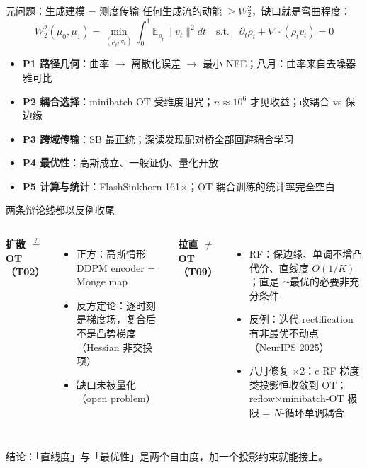 \documentclass[10pt,aspectratio=169]{beamer}
\begin{document}
\begin{frame}{元问题：生成建模 = 测度传输}
任何生成流的动能 $\ge W_2^2$，缺口就是弯曲程度：
\[ W_2^2(\mu_0,\mu_1)=\min_{(\rho_t,v_t)}\int_0^1\mathbb E_{\rho_t}\|v_t\|^2dt\quad\text{s.t.}\quad\partial_t\rho_t+\nabla\!\cdot(\rho_tv_t)=0 \]
\begin{itemize}
\item \textbf{P1 路径几何}：曲率 $\to$ 离散化误差 $\to$ 最小 NFE；八月：曲率来自去噪器雅可比
\item \textbf{P2 耦合选择}：minibatch OT 受维度诅咒；$n\approx10^6$ 才见收益；\textcolor{hl}{改耦合 vs 保边缘}
\item \textbf{P3 跨域传输}：SB 最正统；深读发现配对桥全部回避耦合学习
\item \textbf{P4 最优性}：高斯成立、一般证伪、量化开放
\item \textbf{P5 计算与统计}：FlashSinkhorn 161$\times$；OT 耦合训练的统计率完全空白
\end{itemize}
\end{frame}

\begin{frame}{两条辩论线都以反例收尾}
\begin{columns}
\textbf{扩散 $\overset{?}{=}$ OT（T02）}
\begin{itemize}
\item 正方：高斯情形 DDPM encoder = Monge map
\item 反方定论：逐时刻是梯度场，复合后不是凸势梯度（Hessian 非交换项）
\item \textcolor{bad}{缺口未被量化（open problem）}
\end{itemize}
\textbf{拉直 $\ne$ OT（T09）}
\begin{itemize}
\item RF：保边缘、单调不增凸代价、直线度 $O(1/K)$；直是 $c$-最优的必要非充分条件
\item 反例：迭代 rectification 有非最优不动点（NeurIPS 2025）
\item \textcolor{ok}{八月修复 $\times2$}：c-RF 梯度类投影恒收敛到 OT；reflow$\times$minibatch-OT 极限 = $N$-循环单调耦合
\end{itemize}
\end{columns}
\vspace{4pt}
结论：「直线度」与「最优性」是两个自由度，加一个投影约束就能接上。
\end{frame}
\end{document}
